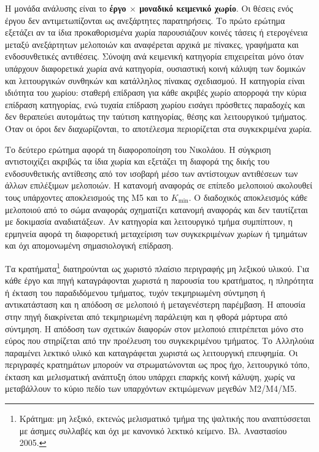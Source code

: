 \documentclass[11pt,a4paper]{article}
\begin{document}
Η μονάδα ανάλυσης είναι το \textbf{έργο $\times$ μοναδικό κειμενικό χωρίο}. Οι θέσεις ενός έργου δεν αντιμετωπίζονται ως ανεξάρτητες παρατηρήσεις. Το πρώτο ερώτημα εξετάζει αν τα ίδια προκαθορισμένα χωρία παρουσιάζουν κοινές τάσεις ή ετερογένεια μεταξύ ανεξάρτητων μελοποιών και αναφέρεται αρχικά με πίνακες, γραφήματα και ενδοσυνθετικές αντιθέσεις. Σύνοψη ανά κειμενική κατηγορία επιχειρείται μόνο όταν υπάρχουν διαφορετικά χωρία ανά κατηγορία, ουσιαστική κοινή κάλυψη των δομικών και λειτουργικών συνθηκών και κατάλληλος πίνακας σχεδιασμού. Η κατηγορία είναι ιδιότητα του χωρίου: σταθερή επίδραση για κάθε ακριβές χωρίο απορροφά την κύρια επίδραση κατηγορίας, ενώ τυχαία επίδραση χωρίου εισάγει πρόσθετες παραδοχές και δεν θεραπεύει αυτομάτως την ταύτιση κατηγορίας, θέσης και λειτουργικού τμήματος. Όταν οι όροι δεν διαχωρίζονται, το αποτέλεσμα περιορίζεται στα συγκεκριμένα χωρία.

Το δεύτερο ερώτημα αφορά τη διαφοροποίηση του Νικολάου. Η σύγκριση αντιστοιχίζει ακριβώς τα ίδια χωρία και εξετάζει τη διαφορά της δικής του ενδοσυνθετικής αντίθεσης από τον ισοβαρή μέσο των αντίστοιχων αντιθέσεων των άλλων επιλέξιμων μελοποιών. Η κατανομή αναφοράς σε επίπεδο μελοποιού ακολουθεί τους υπάρχοντες αποκλεισμούς της M5 και το $K_{\min}$. Ο διαδοχικός αποκλεισμός κάθε μελοποιού από το σώμα αναφοράς σχηματίζει κατανομή αναφοράς και δεν ταυτίζεται με δοκιμασία αναδιατάξεων. Αν κατηγορία και λειτουργικό τμήμα συμπίπτουν, η ερμηνεία αφορά τη διαφορετική μεταχείριση των συγκεκριμένων χωρίων ή τμημάτων και όχι απομονωμένη σημασιολογική επίδραση.

Τα κρατήματα\footnote{Κράτημα: μη λεξικό, εκτενώς μελισματικό τμήμα της ψαλτικής που αναπτύσσεται με άσημες συλλαβές και όχι με κανονικό λεκτικό κείμενο. Βλ. Αναστασίου 2005.} διατηρούνται ως χωριστό πλαίσιο περιγραφής μη λεξικού υλικού. Για κάθε έργο και πηγή καταγράφονται χωριστά η παρουσία του κρατήματος, η πληρότητα ή έκταση του παραδιδόμενου τμήματος, τυχόν τεκμηριωμένη σύντμηση ή αντικατάσταση και η απόδοση σε μελοποιό ή μεταγενέστερη παρέμβαση. Η απουσία στην πηγή διακρίνεται από τεκμηριωμένη παράλειψη και η φθορά μάρτυρα από σύντμηση. Η απόδοση των σχετικών διαφορών στον μελοποιό επιτρέπεται μόνο στο εύρος που στηρίζεται από την προέλευση του συγκεκριμένου τμήματος. Το Αλληλούια παραμένει λεκτικό υλικό και καταγράφεται χωριστά ως λειτουργική επευφημία. Οι περιγραφές κρατημάτων μπορούν να στρωματώνονται ως προς ήχο, λειτουργικό τόπο, έκταση και μελισματική ανάπτυξη όπου υπάρχει επαρκής κοινή κάλυψη, χωρίς να μεταβάλλουν το κύριο πεδίο των υπαρχόντων εκτιμώμενων μεγεθών M2/M4/M5.
\end{document}
